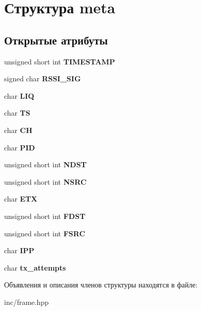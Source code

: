 \hypertarget{structmeta}{}\section{Структура meta}
\label{structmeta}
\subsection*{Открытые атрибуты}
\begin{DoxyCompactItemize}
\item 
\mbox{\label{structmeta_a40769e582be66a70fc64d4477e7bf20d}} 
unsigned short int {\bfseries T\+I\+M\+E\+S\+T\+A\+MP}
\item 
\mbox{\label{structmeta_a78e309234af344092b4e26bdf721670a}} 
signed char {\bfseries R\+S\+S\+I\+\_\+\+S\+IG}
\item 
\mbox{\label{structmeta_a333211a18f4f0b934891c502f3b1156f}} 
char {\bfseries L\+IQ}
\item 
\mbox{\label{structmeta_a26870a531e04df0dd56b4a861bf4517d}} 
char {\bfseries TS}
\item 
\mbox{\label{structmeta_ab1d03702bfbb7bba427f9a82045f8908}} 
char {\bfseries CH}
\item 
\mbox{\label{structmeta_a2d4478746a4343e760c1d7ccfe3e622c}} 
char {\bfseries P\+ID}
\item 
\mbox{\label{structmeta_a1d83d4f9bbb58523a0b9d729a7ee8111}} 
unsigned short int {\bfseries N\+D\+ST}
\item 
\mbox{\label{structmeta_ae252b9b23738601dec654d500451801b}} 
unsigned short int {\bfseries N\+S\+RC}
\item 
\mbox{\label{structmeta_af0dcce4ebad4d0483faa5a1674e8bf3b}} 
char {\bfseries E\+TX}
\item 
\mbox{\label{structmeta_a3c578d650d64a64c3f44372f52f942ae}} 
unsigned short int {\bfseries F\+D\+ST}
\item 
\mbox{\label{structmeta_aa811f972f2aecb8711ac39837487981d}} 
unsigned short int {\bfseries F\+S\+RC}
\item 
\mbox{\label{structmeta_a9925db8ca1204708d4651340aa82da1e}} 
char {\bfseries I\+PP}
\item 
\mbox{\label{structmeta_a20511e5c2e637a9224bb443a08405009}} 
char {\bfseries tx\+\_\+attempts}
\end{DoxyCompactItemize}


Объявления и описания членов структуры находятся в файле\+:\begin{DoxyCompactItemize}
\item 
inc/frame.\+hpp\end{DoxyCompactItemize}
